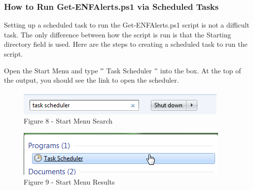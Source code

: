 \documentclass[a4paper,12pt]{report}
\begin{document}
\subsubsection*{How to Run Get-ENFAlerts.ps1 via Scheduled Tasks}
 \par
Setting up a scheduled task to run the Get-ENFAlerts.ps1 script is not a difficult task. The only difference between how the script is run is that the Starting directory field is used. Here are the steps to creating a scheduled task to run the script. \par
\begin{myEnumerate}
\item Open the Start Menu and type  $ " $ Task Scheduler $ " $  into the box. At the top of the output, you should see the link to open the scheduler. \par




\begin{figure}[H]
\begin{center}
\includegraphics[width=4.07in,height=0.47in]{./uploads_new/ENF_Alert_Emails.docx_DIR/media/image14.png}
\end{center}
\caption{Figure 8 - Start Menu Search}
\end{figure}




\vspace{12pt}
\end{myEnumerate}
 \par




\begin{figure}[H]
\begin{center}
\includegraphics[width=4.1in,height=0.89in]{./uploads_new/ENF_Alert_Emails.docx_DIR/media/image15.png}
\end{center}
\caption{Figure 9 - Start Menu Results}
\end{figure}
\end{document}
